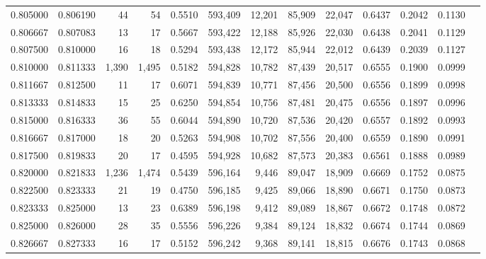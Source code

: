 \begin{tabular}{rrrrrrrrrrrrr}
0.805000 & 0.806190 &     44 &    54 &                                     0.5510 & 593,409 &  12,201 &  85,909 &  22,047 & 0.6437 & 0.2042 & 0.1130 \\
0.806667 & 0.807083 &     13 &    17 &                                     0.5667 & 593,422 &  12,188 &  85,926 &  22,030 & 0.6438 & 0.2041 & 0.1129 \\
0.807500 & 0.810000 &     16 &    18 &                                     0.5294 & 593,438 &  12,172 &  85,944 &  22,012 & 0.6439 & 0.2039 & 0.1127 \\
0.810000 & 0.811333 &  1,390 & 1,495 &                                     0.5182 & 594,828 &  10,782 &  87,439 &  20,517 & 0.6555 & 0.1900 & 0.0999 \\
0.811667 & 0.812500 &     11 &    17 &                                     0.6071 & 594,839 &  10,771 &  87,456 &  20,500 & 0.6556 & 0.1899 & 0.0998 \\
0.813333 & 0.814833 &     15 &    25 &                                     0.6250 & 594,854 &  10,756 &  87,481 &  20,475 & 0.6556 & 0.1897 & 0.0996 \\
0.815000 & 0.816333 &     36 &    55 &                                     0.6044 & 594,890 &  10,720 &  87,536 &  20,420 & 0.6557 & 0.1892 & 0.0993 \\
0.816667 & 0.817000 &     18 &    20 &                                     0.5263 & 594,908 &  10,702 &  87,556 &  20,400 & 0.6559 & 0.1890 & 0.0991 \\
0.817500 & 0.819833 &     20 &    17 &                                     0.4595 & 594,928 &  10,682 &  87,573 &  20,383 & 0.6561 & 0.1888 & 0.0989 \\
0.820000 & 0.821833 &  1,236 & 1,474 &                                     0.5439 & 596,164 &   9,446 &  89,047 &  18,909 & 0.6669 & 0.1752 & 0.0875 \\
0.822500 & 0.823333 &     21 &    19 &                                     0.4750 & 596,185 &   9,425 &  89,066 &  18,890 & 0.6671 & 0.1750 & 0.0873 \\
0.823333 & 0.825000 &     13 &    23 &                                     0.6389 & 596,198 &   9,412 &  89,089 &  18,867 & 0.6672 & 0.1748 & 0.0872 \\
0.825000 & 0.826000 &     28 &    35 &                                     0.5556 & 596,226 &   9,384 &  89,124 &  18,832 & 0.6674 & 0.1744 & 0.0869 \\
0.826667 & 0.827333 &     16 &    17 &                                     0.5152 & 596,242 &   9,368 &  89,141 &  18,815 & 0.6676 & 0.1743 & 0.0868 \\

\end{tabular}
